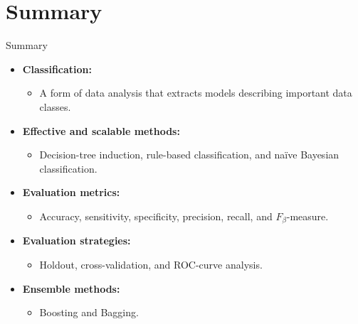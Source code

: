 \section{Summary}

\begin{frame}{Summary}
	\begin{itemize}
		\item \textbf{Classification:}
		      \begin{itemize}
			      \item A form of data analysis that extracts models describing important data classes.
		      \end{itemize}
		\item \textbf{Effective and scalable methods:}
		      \begin{itemize}
			      \item Decision-tree induction, rule-based classification, and naïve Bayesian classification.
		      \end{itemize}
		\item \textbf{Evaluation metrics:}
		      \begin{itemize}
			      \item Accuracy, sensitivity, specificity, precision, recall, and $F_\beta$-measure.
		      \end{itemize}
		\item \textbf{Evaluation strategies:}
		      \begin{itemize}
			      \item Holdout, cross-validation, and ROC-curve analysis.
		      \end{itemize}
		\item \textbf{Ensemble methods:}
		      \begin{itemize}
			      \item Boosting and Bagging.
		      \end{itemize}
	\end{itemize}
\end{frame}
